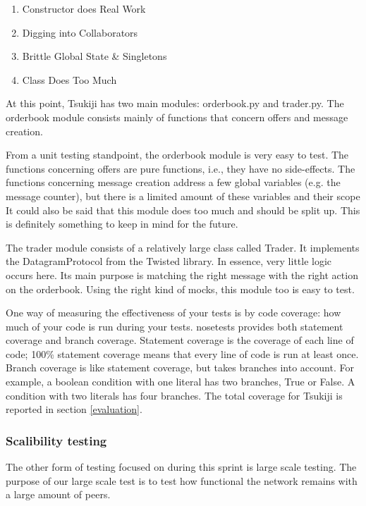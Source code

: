 \begin{enumerate}
\item Constructor does Real Work
\item Digging into Collaborators
\item Brittle Global State \& Singletons
\item Class Does Too Much
\end{enumerate}

At this point, Tsukiji has two main modules: orderbook.py and trader.py.
The orderbook module consists mainly of functions that concern offers and message creation.

From a unit testing standpoint, the orderbook module is very easy to test.
The functions concerning offers are pure functions, i.e., they have no side-effects.
The functions concerning message creation address a few global variables (e.g. the message counter), but there is a limited amount of these variables and their scope
It could also be said that this module does too much and should be split up.
This is definitely something to keep in mind for the future.

The trader module consists of a relatively large class called Trader.
It implements the DatagramProtocol from the Twisted library.
In essence, very little logic occurs here.
Its main purpose is matching the right message with the right action on the orderbook.
Using the right kind of mocks, this module too is easy to test.

One way of measuring the effectiveness of your tests is by code coverage: how much of your code is run during your tests.
nosetests provides both statement coverage and branch coverage.
Statement coverage is the coverage of each line of code; 100\% statement coverage means that every line of code is run at least once.
Branch coverage is like statement coverage, but takes branches into account.
For example, a boolean condition with one literal has two branches, True or False.
A condition with two literals has four branches.
The total coverage for Tsukiji is reported in section \ref{evaluation}.


\subsubsection{Scalibility testing}
The other form of testing focused on during this sprint is large scale testing.
The purpose of our large scale test is to test how functional the network remains with a large amount of peers.